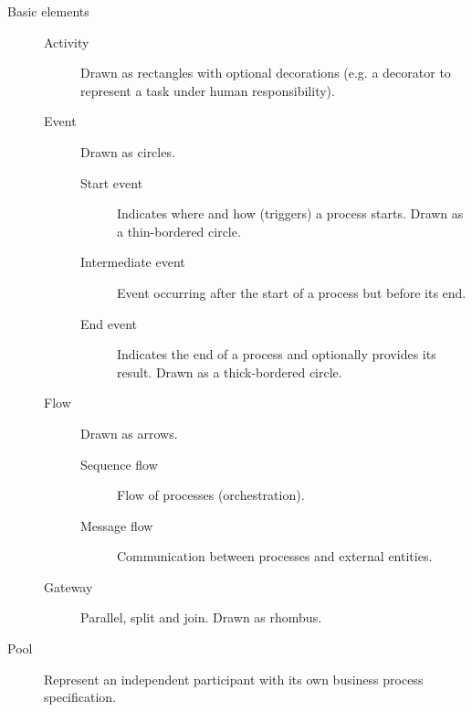 \begin{description}
    \item[Basic elements] \phantom{}
        \begin{description}
            \item[Activity] 
                Drawn as rectangles with optional decorations (e.g. a decorator to represent a task under human responsibility).
            
            \item[Event] 
                Drawn as circles.

                \begin{description}
                    \item[Start event]
                        Indicates where and how (triggers) a process starts.
                        Drawn as a thin-bordered circle.
                    
                    \item[Intermediate event]
                        Event occurring after the start of a process but before its end.

                    \item[End event]
                        Indicates the end of a process and optionally provides its result.
                        Drawn as a thick-bordered circle.
                \end{description}
            
            \item[Flow] 
                Drawn as arrows.

                \begin{description}
                    \item[Sequence flow] 
                        Flow of processes (orchestration).

                    \item[Message flow] 
                        Communication between processes and external entities.
                \end{description}
            
            \item[Gateway] 
                Parallel, split and join. Drawn as rhombus.
        \end{description}

    \item[Pool] 
        Represent an independent participant with its own business process specification.
    

\end{description}
